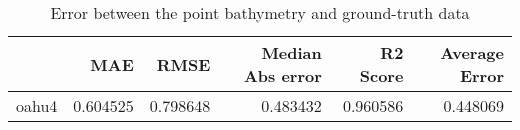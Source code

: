 \begin{table}[h!]
\caption{Error between the point bathymetry and ground-truth data}
\label{tab:oahu4_lidar_error}
\begin{tabular}{lrrrrr}
\toprule
 & MAE & RMSE & Median Abs error & R2 Score & Average Error \\
\midrule
oahu4 & 0.604525 & 0.798648 & 0.483432 & 0.960586 & 0.448069 \\
\bottomrule
\end{tabular}
\end{table}

